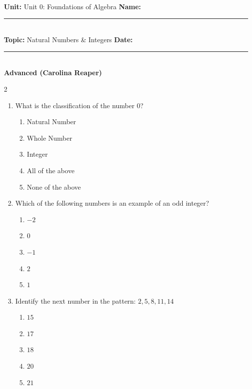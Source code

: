 \documentclass[10pt]{article}
\begin{document}
\enlargethispage{2.5cm}

\begin{tcolorbox}[colback=mainblue!5, colframe=mainblue, sharp corners, boxrule=0.5pt]
    \small \textbf{Unit:} Unit 0: Foundations of Algebra \hfill \textbf{Name:} \rule{3cm}{0.4pt} \\
    \small \textbf{Topic:} Natural Numbers & Integers \hfill \textbf{Date:} \rule{2cm}{0.4pt} \\
    \centering \textbf{\large Advanced (Carolina Reaper)}
\end{tcolorbox}

\vspace{0.2cm}

\begin{multicols}{2}
\begin{enumerate}[label=\textbf{Q\arabic*.}, leftmargin=*, itemsep=6pt, parsep=0pt]

  \item \small What is the classification of the number $0$?
  \begin{enumerate}[label=(\Alph*), leftmargin=0.6cm, nosep, itemsep=2pt]
    \item Natural Number
    \item Whole Number
    \item Integer
    \item All of the above
    \item None of the above
  \end{enumerate}

  \item \small Which of the following numbers is an example of an odd integer?
  \begin{enumerate}[label=(\Alph*), leftmargin=0.6cm, nosep, itemsep=2pt]
    \item $-2$
    \item $0$
    \item $-1$
    \item $2$
    \item $1$
  \end{enumerate}

  \item \small Identify the next number in the pattern: $2, 5, 8, 11, 14$
  \begin{enumerate}[label=(\Alph*), leftmargin=0.6cm, nosep, itemsep=2pt]
    \item $15$
    \item $17$
    \item $18$
    \item $20$
    \item $21$
  \end{enumerate}


\end{enumerate}
\end{multicols}
\end{document}
